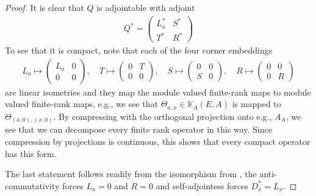 \begin{proof}
	It is clear that $Q$ is adjointable with adjoint
	\begin{align*}
		Q^* = \begin{pmatrix}
			L_a^* & S^* \\ T^* & R^*
		\end{pmatrix}
	\end{align*}
	To see that it is compact, note that each of the four corner embeddings 
	\begin{align*}
		L_a \mapsto 
		\begin{pmatrix}
			L_a & 0 \\ 0 & 0
		\end{pmatrix}, 
		\quad 
		T \mapsto \begin{pmatrix}
			0 & T \\ 0 & 0 
		\end{pmatrix}, 
		\quad 
		S \mapsto \begin{pmatrix}
			0 & 0 \\ S & 0 
		\end{pmatrix}, 
		\quad 
		R \mapsto \begin{pmatrix}
			0 & 0 \\ 0 & R
		\end{pmatrix}
	\end{align*}
	are linear isometries and they map the module valued finite-rank maps to module valued finite-rank maps, e.g., we see that $\Theta_{a,x} \in \mathbb{K}_A(E,A)$ is mapped to $\Theta_{(a,0),(x,0)}$. By compressing with the orthogonal projection onto e.g., $A_A$, we see that we can decompose every finite rank operator in this way. Since compression by projections is continuous, this shows that every compact operator has this form.

	The last statement follows readily from the isomorphism from , the anti-commutativity forces $L_a = 0$ and $R = 0$ and self-adjointess forces $D_x^* = L_x$.
\end{proof}

